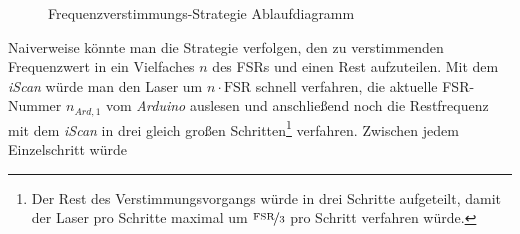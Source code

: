 \begin{figure}[hp]
 	\centering
	\caption[Frequenzverstimmungs-Strategie
	-
	Ablaufdiagramm]{Frequenzverstimmungs-Strategie
	Ablaufdiagramm}\label{fig:frequenzverstimmungs-strategie_ablaufdiagramm}
\end{figure}
Naiverweise könnte man die Strategie verfolgen, den zu verstimmenden
Frequenzwert in ein Vielfaches $n$ des FSRs und einen Rest aufzuteilen. Mit dem
\textit{iScan} würde man den Laser um $n\cdot\text{FSR}$ schnell verfahren,
die aktuelle FSR-Nummer $n_{Ard,1}$ vom \textit{Arduino} auslesen und anschließend
noch die Restfrequenz mit dem \textit{iScan} in drei gleich großen
Schritten\footnote{Der Rest des Verstimmungsvorgangs würde in drei Schritte
aufgeteilt, damit der Laser pro Schritte maximal um $\nicefrac{\text{FSR}}{3}$
pro Schritt verfahren würde.} verfahren. Zwischen jedem Einzelschritt würde
